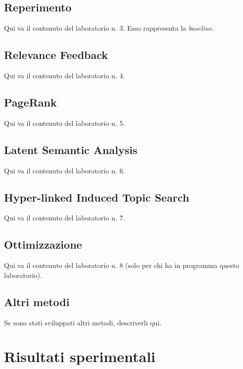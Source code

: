\documentclass{llncs}
\begin{document}
\subsection{Reperimento}
\label{sec:metodi-di-reper}

Qui va il contenuto del laboratorio n. 3. Esso rappresenta la \textit{baseline}.

\subsection{Relevance Feedback}
\label{sec:relevance-feedback}

Qui va il contenuto del laboratorio n. 4.

\subsection{PageRank}
\label{sec:pagerank}

Qui va il contenuto del laboratorio n. 5.

\subsection{Latent Semantic Analysis}
\label{sec:lsa}

Qui va il contenuto del laboratorio n. 6.

\subsection{Hyper-linked Induced Topic Search}
\label{sec:hits}

Qui va il contenuto del laboratorio n. 7.

\subsection{Ottimizzazione}
\label{sec:hits}

Qui va il contenuto del laboratorio n. 8 (solo per chi ha in programma questo
laboratorio). 

\subsection{Altri metodi}
\label{sec:altri-metodi}

Se sono stati sviluppati altri metodi, descriverli qui.

\section{Risultati sperimentali}
\label{sec:risult-sper}
\end{document}
